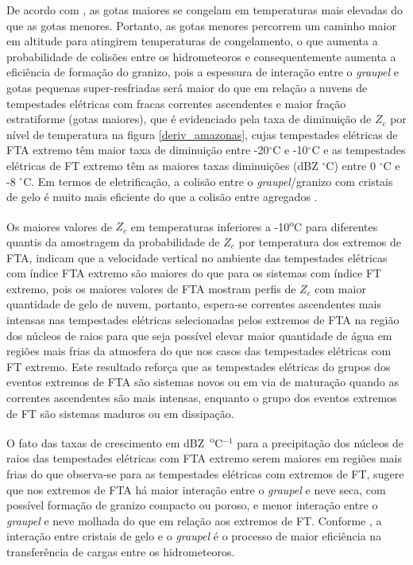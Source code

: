 De acordo com , as gotas maiores se congelam em temperaturas mais elevadas do que as gotas menores. Portanto, as gotas menores percorrem um caminho maior em altitude para atingirem temperaturas de congelamento, o que aumenta a probabilidade de colisões entre os hidrometeoros e consequentemente aumenta a eficiência de formação do granizo, pois a espessura de interação entre o \textit{graupel} e gotas pequenas super-resfriadas será maior do que em relação a nuvens de tempestades elétricas com fracas correntes ascendentes e maior fração estratiforme (gotas maiores), que é evidenciado pela taxa de diminuição de $Z_c$ por nível de temperatura na figura \ref{deriv_amazonas}, cujas  tempestades elétricas de FTA extremo têm maior taxa de diminuição entre -20$^{\circ}$C e -10$^{\circ}$C e as tempestades elétricas de FT extremo têm as maiores taxas diminuições (dBZ $^{\circ}$C) entre 0 $^{\circ}$C e -8 $^{\circ}$C. Em termos de eletrificação, a colisão entre o \textit{graupel}/granizo  com cristais de gelo é muito mais eficiente do que a colisão entre agregados \cite{Takahashi1978, jayaratne1983}.


Os maiores valores de $Z_c$ em temperaturas inferiores a -10\textsuperscript{o}C para diferentes quantis da amostragem da probabilidade de $Z_c$ por temperatura dos extremos de FTA, indicam que a velocidade vertical no ambiente das tempestades elétricas com índice FTA extremo são maiores do que para os sistemas com índice FT extremo, pois os maiores valores de FTA mostram perfis de $Z_c$ com maior quantidade de gelo de nuvem, portanto, espera-se correntes ascendentes mais intensas nas tempestades elétricas selecionadas pelos extremos de FTA na região dos núcleos de raios para que seja possível elevar maior quantidade de água em regiões mais frias da atmosfera do que nos casos das tempestades elétricas com FT extremo. Este resultado reforça que as tempestades elétricas do grupos dos eventos extremos de FTA são sistemas novos ou em via de maturação quando as correntes ascendentes são mais intensas, enquanto o grupo dos eventos extremos de FT são sistemas maduros ou em dissipação.

O fato das taxas de crescimento em dBZ~\textsuperscript{o}C$^{-1}$ para a precipitação dos núcleos de raios das tempestades elétricas com FTA extremo serem maiores  em regiões mais frias do que observa-se para as tempestades elétricas com extremos de FT, sugere que nos extremos de FTA há maior interação entre o \textit{graupel} e neve seca, com possível formação de granizo compacto ou poroso, e menor interação entre o \textit{graupel} e neve molhada do que em relação aos extremos de FT. Conforme , a interação entre cristais de gelo e o \textit{graupel} é o processo de maior eficiência na transferência de cargas entre os hidrometeoros. 

